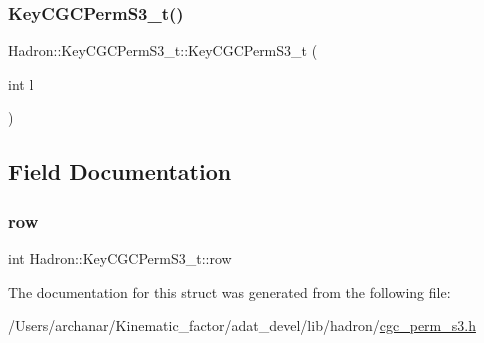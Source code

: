 \mbox{\label{structHadron_1_1KeyCGCPermS3__t_af58d8b287b6da4b7998735e67be0f1f9}} 
\subsubsection{\texorpdfstring{KeyCGCPermS3\_t()}{KeyCGCPermS3\_t()}\hspace{0.1cm}{\footnotesize\ttfamily [4/4]}}
{\footnotesize\ttfamily Hadron\+::\+Key\+C\+G\+C\+Perm\+S3\+\_\+t\+::\+Key\+C\+G\+C\+Perm\+S3\+\_\+t (\begin{DoxyParamCaption}\item[{int}]{l }\end{DoxyParamCaption})\hspace{0.3cm}{\ttfamily [inline]}}



\subsection{Field Documentation}
\mbox{\label{structHadron_1_1KeyCGCPermS3__t_ae42674e0246b466965e187a7210cd8e2}} 
\subsubsection{\texorpdfstring{row}{row}}
{\footnotesize\ttfamily int Hadron\+::\+Key\+C\+G\+C\+Perm\+S3\+\_\+t\+::row}



The documentation for this struct was generated from the following file\+:\begin{DoxyCompactItemize}
\item 
/\+Users/archanar/\+Kinematic\+\_\+factor/adat\+\_\+devel/lib/hadron/\mbox{\hyperlink{lib_2hadron_2cgc__perm__s3_8h}{cgc\+\_\+perm\+\_\+s3.\+h}}\end{DoxyCompactItemize}
